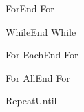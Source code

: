          {For}{}{End For}

         {While}{}{End While}

         {For Each}{}{End For}

         {For All}{}{End For}

            {Repeat}{Until}




\newlength{\tocPartLength}
\newlength{\tocPartLineLength}

\renewcommand*\l@part[2]{%
  \ifnum \c@tocdepth >-2\relax
    \addpenalty{-\@highpenalty}%
    \addvspace{2.25em \@plus\p@}%
    \setlength\@tempdima{3em}%
    \begingroup
      \parindent \z@ \rightskip \@pnumwidth
      \parfillskip -\@pnumwidth
      {\leavevmode
       \LARGE\bfseries\boldmath\color{clTocPart}%
       \settowidth{\tocPartLength}{#1}%
       \addtolength{\tocPartLength}{.5em}%
       \setlength{\tocPartLineLength}{\linewidth}%
       \addtolength{\tocPartLineLength}{-\tocPartLength}%
       #1\hspace*{\fill}\rule[.5ex]{\tocPartLineLength}{2pt}%
       }\par
       \nobreak
         \global\@nobreaktrue
         \everypar{\global\@nobreakfalse\everypar{}}%
    \endgroup
  \fi}
\renewcommand*\l@chapter[2]{%
  \ifnum \c@tocdepth >\m@ne
    \addpenalty{-\@highpenalty}%
    \vskip 1.0em \@plus\p@
    \setlength\@tempdima{1.5em}%
    \begingroup
      \parindent \z@ \rightskip \@pnumwidth
      \parfillskip -\@pnumwidth
      \leavevmode \bfseries\boldmath\color{clTocChapter}
      \advance\leftskip\@tempdima
      \hskip -\leftskip
      #1\nobreak\hfil \nobreak\hb@xt@\@pnumwidth{\hss #2}\par
      \penalty\@highpenalty
    \endgroup
  \fi}

\makeatother
